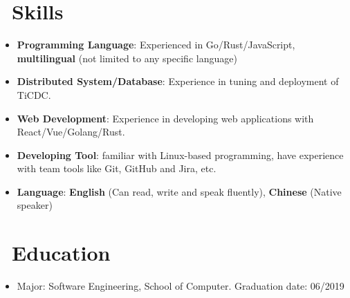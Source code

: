\documentclass{resume}
\newcommand{\en}[1]{#1}
\newcommand{\zh}[1]{}
\begin{document}
\section{\faCogs\ \en{Skills}\zh{技能}}
\begin{itemize}[parsep=0.25ex]
      \item \en{\textbf{Programming Language}:
                  Experienced in Go/Rust/JavaScript,
                  \textbf{multilingual} (not limited to any specific language)}
            \zh{\textbf{编程语言}:
                  熟悉 Go/Rust/JavaScript，
                  \textbf{泛语言}（编程不受特定语言限制）}

      \item \en{\textbf{Distributed System/Database}:
                  Experience in tuning and deployment of TiCDC.}
            \zh{\textbf{分布式系统/数据库}:
                  有分布式系统 TiCDC/TiKV/TiDB 的调优开发以及部署经验。}

      \item \en{\textbf{Web Development}:
                  Experience in developing web applications with React/Vue/Golang/Rust.}
            \zh{\textbf{网站开发}:
                  有使用 React/Vue/Golang/Rust 开发网站应用的经验。}

      \item \en{\textbf{Developing Tool}:
                  familiar with Linux-based programming,
                  have experience with team tools like Git, GitHub and Jira, etc.}
            \zh{\textbf{开发工具}:
                  熟悉 Linux，有 Git、GitHub 和 Jira 等团队协作工具的使用经验}

      \item \en{\textbf{Language}:
                  \textbf{English} (Can read, write and speak fluently),
                  \textbf{Chinese} (Native speaker)}
            \zh{\textbf{语言}:
                  \textbf{英语} （可以流利的听说读写），
                  \textbf{中文} （母语）}
\end{itemize}

\section{\faGraduationCap\ \en{Education}\zh{教育经历}}
\en{}
\zh{\datedsubsection{\textbf{重庆理工大学}, 本科}{2015/09 -- 2019/06}}
\begin{itemize}
      \item \en{Major: Software Engineering, School of Computer. Graduation date: 06/2019}
            \zh{软件工程，计算机学院，2019 年 6 月毕业}
\end{itemize}
\end{document}
